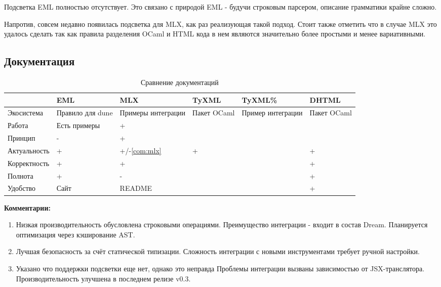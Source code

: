 Подсветка EML полностью отсутствует.
Это связано с природой EML - будучи строковым парсером, описание грамматики крайне сложно.

Напротив, совсем недавно появилась подсветка для MLX, как раз реализующая такой подход.
Стоит также отметить что в случае MLX это удалось сделать так как правила разделения OCaml и HTML кода в нем являются значительно более простыми и менее вариативными.


\subsection{Документация}

\begin{table}[h!]
\begin{tabularx}{\textwidth}{
    lXXXXX}
    \toprule
 & EML & MLX & TyXML & TyXML\% & DHTML \\
 \midrule
Экосистема & Правило для dune & Примеры интеграции & Пакет OCaml & Пример интеграции & Пакет OCaml \\

Работа & Есть примеры & + &  &  &  \\
Принцип & - & + & \multicolumn{2}{l}{} &  \\
Актуальность & + & +/-\ref{com:mlx} & \multicolumn{2}{l}{+} & + \\
Корректность & + & + &  &  & + \\
Полнота & + & - &  &  & + \\
Удобство & Сайт & README & \multicolumn{2}{l}{} & + \\
\bottomrule
\end{tabularx}
\caption{Сравнение документаций}
\label{tab:docs}
\end{table}

\begin{minipage}{.8\linewidth}
\footnotesize
\textbf{Комментарии:}
\begin{enumerate}
    \item \label{com:eml}
    Низкая производительность обусловлена строковыми операциями. 
    Преимущество интеграции - входит в состав Dream. 
    Планируется оптимизация через кэширование AST.
    
    \item \label{com:tyxml}
    Лучшая безопасность за счёт статической типизации. 
    Сложность интеграции с новыми инструментами требует ручной настройки.
    
    \item \label{com:mlx}
    Указано что поддержки подсветки еще нет, однако это неправда
    Проблемы интеграции вызваны зависимостью от JSX-транслятора. 
    Производительность улучшена в последнем релизе v0.3.
\end{enumerate}
\end{minipage}

